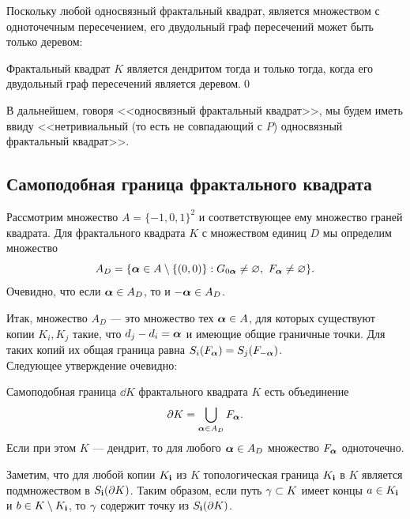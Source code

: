 Поскольку любой односвязный фрактальный квадрат, является множеством с одноточечным пересечением, его двудольный граф пересечений может быть только деревом:

\begin{corollary}\label{cor:fsden}
Фрактальный квадрат $K$ является дендритом тогда и только тогда, когда его двудольный граф пересечений является деревом.\hfill\qed
\end{corollary}

В дальнейшем, говоря <<односвязный фрактальный квадрат>>, мы будем иметь ввиду <<нетривиальный (то есть не совпадающий с $P$) односвязный фрактальный квадрат>>.


\subsection{Самоподобная граница фрактального квадрата}

Рассмотрим множество $A=\{-1,0,1\}^2$ и соответствующее ему множество граней квадрата. 
Для фрактального квадрата $K$ с множеством единиц $D$ мы определим множество 
$$A_D=\{{\bm{\alpha}}\in A\setminus\{(0,0)\}: G_{0{\bm{\alpha}}}\neq\varnothing,\ F_{\bm{\alpha}}\neq\varnothing\}.$$ 
Очевидно, что если ${\bm{\alpha}}\in A_D$, то и $-{\bm{\alpha}}\in A_D$.

Итак, множество $A_D$ --- это множество тех ${\bm{\alpha}}\in A$, для которых существуют копии $K_i, K_j$ такие, что $d_j-d_i={\bm{\alpha}}$ и имеющие общие граничные точки. 
Для таких копий их общая граница равна $S_i(F_{\bm{\alpha}})=S_j(F_{-{\bm{\alpha}}})$.\\

Следующее утверждение очевидно:

\begin{proposition}\label{prop:dd}
Самоподобная граница $\dd K$ фрактального квадрата $K$ есть объединение
$$\partial K=\bigcup\limits_{{\bm{\alpha}}\in A_D}F_{\bm{\alpha}}.$$
Если при этом $K$ --- дендрит, то для любого ${\bm{\alpha}}\in A_D$ множество $F_{\bm{\alpha}}$ одноточечно.
\end{proposition}

Заметим, что для любой копии $K_{\bf{i}}$ из $K$ топологическая граница $K_{\bf{i}}$ в $K$ является подмножеством в 
$S_{\bf{i}}(\partial K)$. 
Таким образом, если путь $\gamma\subset K$ имеет концы $a\in K_{\bf{i}}$ и $b\in K\setminus K_{\bf{i}}$, то $\gamma$ содержит точку из $S_{\bf{i}}(\partial K)$.


